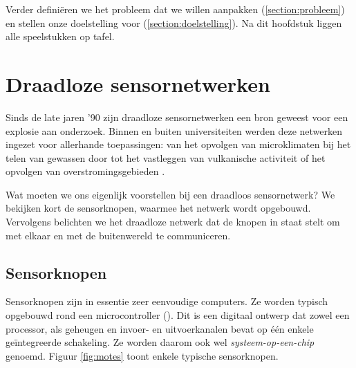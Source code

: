 Verder defini\"eren we het probleem dat we willen aanpakken
(\ref{section:probleem}) en stellen onze doelstelling voor
(\ref{section:doelstelling}). Na dit hoofdstuk liggen alle speelstukken op
tafel.

\section{Draadloze sensornetwerken}
\label{section:wsn}

Sinds de late jaren '90 zijn draadloze sensornetwerken een bron geweest voor
een explosie aan onderzoek. Binnen en buiten universiteiten werden deze
netwerken ingezet voor allerhande toepassingen: van het opvolgen van
microklimaten bij het telen van gewassen door \citep{baggio2005wireless} tot het
vastleggen van vulkanische activiteit \citep{werner2005monitoring} of het
opvolgen van overstromingsgebieden \citep{hughes2006gridstix}.

Wat moeten we ons eigenlijk voorstellen bij een draadloos sensornetwerk? We
bekijken kort de sensorknopen, waarmee het netwerk wordt opgebouwd. Vervolgens
belichten we het draadloze netwerk dat de knopen in staat stelt om met elkaar
en met de buitenwereld te communiceren.

\subsection{Sensorknopen}

Sensorknopen zijn in essentie zeer eenvoudige computers. Ze worden typisch
opgebouwd rond een microcontroller (\mcu). Dit is een digitaal ontwerp dat
zowel een processor, als geheugen en invoer- en uitvoerkanalen bevat op \'e\'en
enkele ge\"integreerde schakeling. Ze worden daarom ook wel
\emph{systeem-op-een-chip} genoemd. Figuur \ref{fig:motes} toont enkele
typische sensorknopen.

